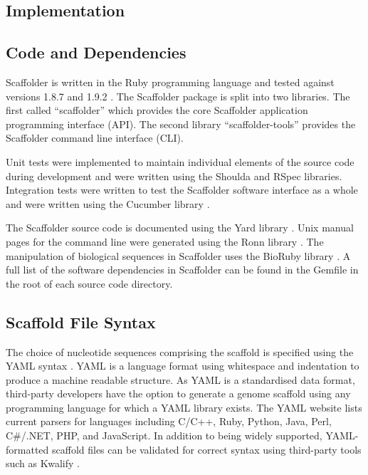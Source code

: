 \documentclass[10pt]{bmc_article}
\newenvironment{bmcformat}{\begin{raggedright}\baselineskip20pt\sloppy\setboolean{publ}{false}}{\end{raggedright}\baselineskip20pt\sloppy}
\begin{document}
\begin{bmcformat}
\clearpage

\section*{Implementation} %

\subsection*{Code and Dependencies} %

Scaffolder is written in the Ruby programming language and tested against
versions 1.8.7 and 1.9.2 \cite{ruby-lang}. The Scaffolder package is split into
two libraries. The first called ``scaffolder'' which provides the core
Scaffolder application programming interface (API). The second library
``scaffolder-tools'' provides the Scaffolder command line interface (CLI). \pb

Unit tests were implemented to maintain individual elements of the source code
during development and were written using the Shoulda and RSpec \cite{rspec}
libraries. Integration tests were written to test the Scaffolder software
interface as a whole and were written using the Cucumber library \cite{rspec}.
\pb

The Scaffolder source code is documented using the Yard library \cite{yard}.
Unix manual pages for the command line were generated using the Ronn library
\cite{ronn}. The manipulation of biological sequences in Scaffolder uses the
BioRuby library \cite{goto2010}. A full list of the software dependencies in
Scaffolder can be found in the Gemfile in the root of each source code
directory. \pb

\subsection*{Scaffold File Syntax} %

The choice of nucleotide sequences comprising the scaffold is specified using
the YAML syntax \cite{yaml}. YAML is a language format using whitespace and
indentation to produce a machine readable structure. As YAML is a standardised
data format, third-party developers have the option to generate a genome
scaffold using any programming language for which a YAML library exists. The
YAML website lists current parsers for languages including C/C++, Ruby, Python,
Java, Perl, C\#/.NET, PHP, and JavaScript. In addition to being widely
supported, YAML-formatted scaffold files can be validated for correct syntax
using third-party tools such as Kwalify \cite{kwalify}. \pb


\end{bmcformat}
\end{document}
